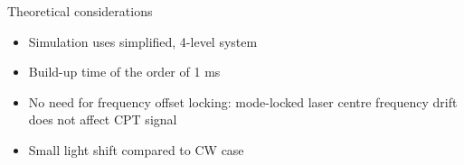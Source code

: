 \begin{block}{Theoretical considerations}
  \begin{itemize}
  \item Simulation uses simplified, 4-level system
  \item Build-up time of the order of 1 ms
  \item No need for frequency offset locking: mode-locked laser centre frequency drift does not affect CPT signal
  \item Small light shift compared to CW case
  \end{itemize}
\end{block}

